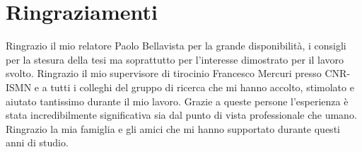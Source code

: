 \documentclass[12pt,a4paper,openright,twoside]{report}
\begin{document}
\chapter*{Ringraziamenti}
Ringrazio il mio relatore Paolo Bellavista per la grande disponibilità, i consigli per la stesura della tesi ma soprattutto per l'interesse dimostrato per il lavoro svolto.
Ringrazio il mio supervisore di tirocinio Francesco Mercuri presso CNR-ISMN e a tutti i colleghi del gruppo di ricerca che mi hanno accolto, stimolato e aiutato tantissimo durante il mio lavoro. Grazie a queste persone l'esperienza è stata incredibilmente significativa sia dal punto di vista professionale che umano.
Ringrazio la mia famiglia e gli amici che mi hanno supportato durante questi anni di studio.
\endgroup
\end{document}
